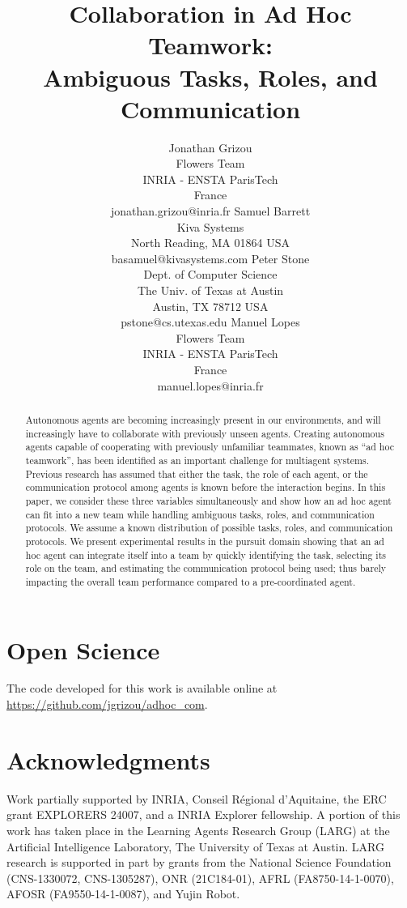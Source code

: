 \documentclass[a4paper]{article}
\title{Collaboration in Ad Hoc Teamwork: \\
Ambiguous Tasks, Roles, and Communication\vspace{1em}}
\author{
Jonathan Grizou \\ Flowers Team \\ INRIA - ENSTA ParisTech \\  France \\ jonathan.grizou@inria.fr
\And
Samuel Barrett \\ Kiva Systems \\ North Reading, MA 01864 USA \\ basamuel@kivasystems.com
\AND
Peter Stone \\ Dept. of Computer Science \\ The Univ. of Texas at Austin \\ Austin, TX 78712 USA \\ pstone@cs.utexas.edu
\And
Manuel Lopes \\ Flowers Team \\ INRIA - ENSTA ParisTech \\  France \\ manuel.lopes@inria.fr
}
\begin{document}
\maketitle

\begin{abstract}
Autonomous agents are becoming increasingly present in our environments, and will increasingly have to collaborate with previously unseen agents. Creating autonomous agents capable of cooperating with previously unfamiliar teammates, known as ``ad hoc teamwork'', has been identified as an important challenge for multiagent systems. Previous research has assumed that either the task, the role of each agent, or the communication protocol among agents is known before the interaction begins. In this paper, we consider these three variables simultaneously and show how an ad hoc agent can fit into a new team while handling ambiguous tasks, roles, and communication protocols. We assume a known distribution of possible tasks, roles, and communication protocols. We present experimental results in the pursuit domain showing that an ad hoc agent can integrate itself into a team by quickly identifying the task, selecting its role on the team, and estimating the communication protocol being used; thus barely impacting the overall team performance compared to a pre-coordinated agent.
\end{abstract}













\section*{Open Science}

The code developed for this work is available online at \url{https://github.com/jgrizou/adhoc_com}.

\section*{Acknowledgments}

Work partially supported by INRIA, Conseil R\'{e}gional d'Aquitaine, the ERC grant EXPLORERS 24007, and a INRIA Explorer fellowship. A portion of this work has taken place in the Learning Agents Research Group (LARG) at the Artificial Intelligence Laboratory, The University of Texas at Austin.  LARG research is supported in part by grants from the National Science Foundation (CNS-1330072, CNS-1305287), ONR (21C184-01), AFRL (FA8750-14-1-0070), AFOSR (FA9550-14-1-0087), and Yujin Robot.




\end{document}
